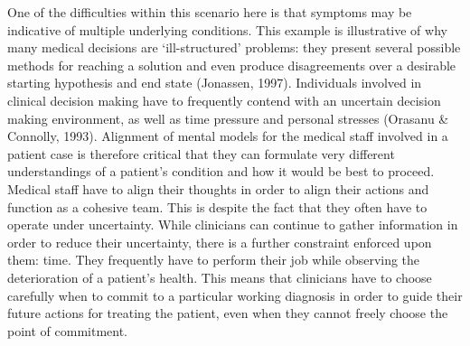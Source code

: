\documentclass[a4paper, nobind]{templates/ociamthesis}
\begin{document}
One of the difficulties within this scenario here is that symptoms may be indicative of multiple underlying conditions. This example is illustrative of why many medical decisions are `ill-structured' problems: they present several possible methods for reaching a solution and even produce disagreements over a desirable starting hypothesis and end state (Jonassen, 1997). Individuals involved in clinical decision making have to frequently contend with an uncertain decision making environment, as well as time pressure and personal stresses (Orasanu \& Connolly, 1993). Alignment of mental models for the medical staff involved in a patient case is therefore critical that they can formulate very different understandings of a patient's condition and how it would be best to proceed. Medical staff have to align their thoughts in order to align their actions and function as a cohesive team. This is despite the fact that they often have to operate under uncertainty. While clinicians can continue to gather information in order to reduce their uncertainty, there is a further constraint enforced upon them: time. They frequently have to perform their job while observing the deterioration of a patient's health. This means that clinicians have to choose carefully when to commit to a particular working diagnosis in order to guide their future actions for treating the patient, even when they cannot freely choose the point of commitment.
\end{document}
